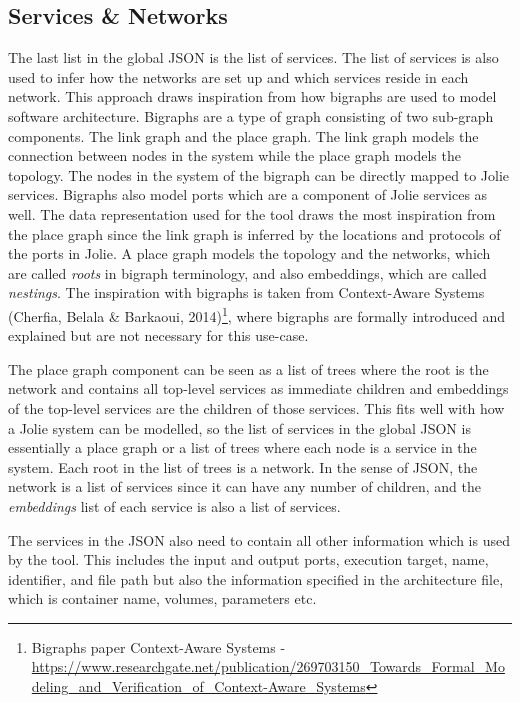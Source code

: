 \subsection{Services \& Networks}
The last list in the global JSON is the list of services. The list of services is also used to infer how the networks are set up and which services reside in each network.
This approach draws inspiration from how bigraphs are used to model software architecture. Bigraphs are a type of graph consisting of two sub-graph components. The link graph and the place graph. The link graph models the connection between nodes in the system while the place graph models the topology.
The nodes in the system of the bigraph can be directly mapped to Jolie services. Bigraphs also model ports which are a component of Jolie services as well.
The data representation used for the tool draws the most inspiration from the place graph since the link graph is inferred by the locations and protocols of the ports in Jolie.
A place graph models the topology and the networks, which are called \textit{roots} in bigraph terminology, and also embeddings, which are called \textit{nestings}.
The inspiration with bigraphs is taken from Context-Aware Systems (Cherfia, Belala \& Barkaoui, 2014)\footnote{Bigraphs paper Context-Aware Systems - \url{https://www.researchgate.net/publication/269703150_Towards_Formal_Modeling_and_Verification_of_Context-Aware_Systems}}, where bigraphs are formally introduced and explained but are not necessary for this use-case.

The place graph component can be seen as a list of trees where the root is the network and contains all top-level services as immediate children and embeddings of the top-level services are the children of those services.
This fits well with how a Jolie system can be modelled, so the list of services in the global JSON is essentially a place graph or a list of trees where each node is a service in the system.
Each root in the list of trees is a network. In the sense of JSON, the network is a list of services since it can have any number of children, and the \textit{embeddings} list of each service is also a list of services.

The services in the JSON also need to contain all other information which is used by the tool.
This includes the input and output ports, execution target, name, identifier, and file path but also the information specified in the architecture file, which is container name, volumes, parameters etc.

\clearpage
